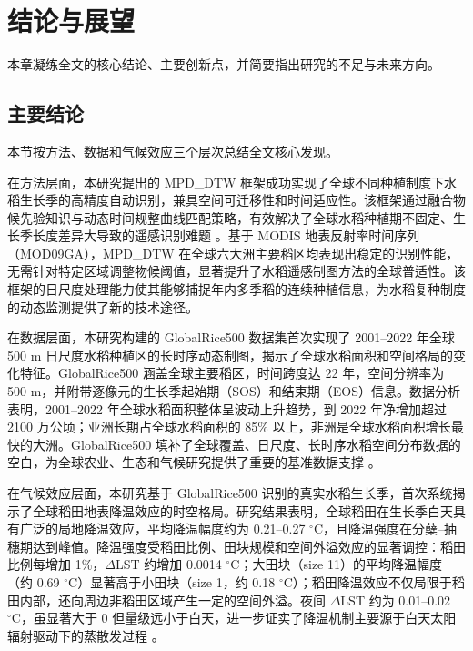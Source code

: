 \chapter{结论与展望}

本章凝练全文的核心结论、主要创新点，并简要指出研究的不足与未来方向。

\section{主要结论}

本节按方法、数据和气候效应三个层次总结全文核心发现。

在方法层面，本研究提出的 MPD\_DTW 框架成功实现了全球不同种植制度下水稻生长季的高精度自动识别，兼具空间可迁移性和时间适应性。该框架通过融合物候先验知识与动态时间规整曲线匹配策略，有效解决了全球水稻种植期不固定、生长季长度差异大导致的遥感识别难题 \cite{Dong2016, Maus2016}。基于 MODIS 地表反射率时间序列（MOD09GA），MPD\_DTW 在全球六大洲主要稻区均表现出稳定的识别性能，无需针对特定区域调整物候阈值，显著提升了水稻遥感制图方法的全球普适性。该框架的日尺度处理能力使其能够捕捉年内多季稻的连续种植信息，为水稻复种制度的动态监测提供了新的技术途径。

在数据层面，本研究构建的 GlobalRice500 数据集首次实现了 2001--2022 年全球 500 m 日尺度水稻种植区的长时序动态制图，揭示了全球水稻面积和空间格局的变化特征。GlobalRice500 涵盖全球主要稻区，时间跨度达 22 年，空间分辨率为 500 m，并附带逐像元的生长季起始期（SOS）和结束期（EOS）信息。数据分析表明，2001--2022 年全球水稻面积整体呈波动上升趋势，到 2022 年净增加超过 2100 万公顷；亚洲长期占全球水稻面积的 85\% 以上，非洲是全球水稻面积增长最快的大洲。GlobalRice500 填补了全球覆盖、日尺度、长时序水稻空间分布数据的空白，为全球农业、生态和气候研究提供了重要的基准数据支撑 \cite{Potapov2022, Zabel2019}。

在气候效应层面，本研究基于 GlobalRice500 识别的真实水稻生长季，首次系统揭示了全球稻田地表降温效应的时空格局。研究结果表明，全球稻田在生长季白天具有广泛的局地降温效应，平均降温幅度约为 0.21--0.27 $^{\circ}\mathrm{C}$，且降温强度在分蘖--抽穗期达到峰值。降温强度受稻田比例、田块规模和空间外溢效应的显著调控：稻田比例每增加 1\%，$\Delta$LST 约增加 0.0014 $^{\circ}\mathrm{C}$；大田块（size 11）的平均降温幅度（约 0.69 $^{\circ}\mathrm{C}$）显著高于小田块（size 1，约 0.18 $^{\circ}\mathrm{C}$）；稻田降温效应不仅局限于稻田内部，还向周边非稻田区域产生一定的空间外溢。夜间 $\Delta$LST 约为 0.01--0.02 $^{\circ}\mathrm{C}$，虽显著大于 0 但量级远小于白天，进一步证实了降温机制主要源于白天太阳辐射驱动下的蒸散发过程 \cite{Xue2021RemoteSensing, Weng2025}。

